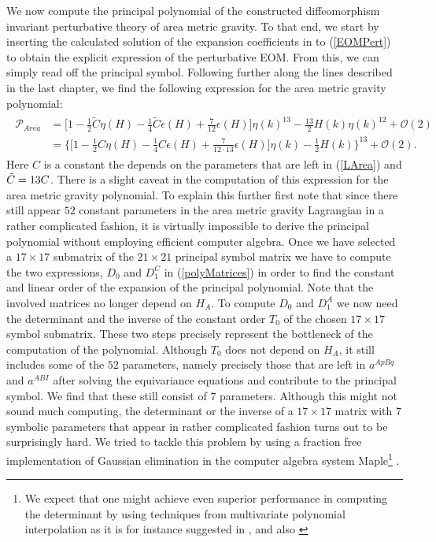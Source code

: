 We now compute the principal polynomial of the constructed diffeomorphism invariant perturbative theory of area metric gravity. To that end, we start by inserting the calculated solution of the expansion coefficients in to (\ref{EOMPert}) to obtain the explicit expression of the perturbative EOM. From this, we can simply read off the principal symbol. Following further along the lines described in the last chapter, we find the following expression for the area metric gravity polynomial:
\begin{align} \label{AreaPoly}
\begin{aligned}
    \mathcal{P}_{Area} &= \bigl[1 - \frac{1}{2} \tilde{C}\eta(H) - \frac{1}{4} \tilde{C} \epsilon(H) + \frac{7}{12} \epsilon(H) \bigr] \eta(k)^{13} - \frac{13}{2}H(k) \eta(k)^{12} + \mathcal{O}(2) \\
    &=\bigl\{  \bigl[ 1 - \frac{1}{2} C \eta(H) - \frac{1}{4} C \epsilon(H) +  \frac{7}{12\cdot13} \epsilon(H) \bigr] \eta(k) - \frac{1}{2} H(k)       \bigr\}^{13} + \mathcal{O}(2).
\end{aligned}
\end{align}
Here $C$ is a constant the depends on the parameters that are left in (\ref{LArea}) and $\Tilde{C} = 13 C$.
There is a slight caveat in the computation of this expression for the area metric gravity polynomial. 
To explain this further first note that since there still appear $52$ constant parameters in the area metric gravity Lagrangian in a rather complicated fashion, it is virtually impossible to derive the principal polynomial without employing efficient computer algebra. Once we have selected a $17 \times 17$ submatrix of the $21 \times 21$ principal symbol matrix we have to compute the two expressions, $D_0$ and $D_{1}^C$ in (\ref{polyMatrices}) in order to find the constant and linear order of the expansion of the principal polynomial. Note that the involved matrices no longer depend on $H_A$. To compute $D_0$ and $D_1^A$ we now need the determinant and the inverse of the constant order $T_0$ of the chosen $17 \times 17$ symbol submatrix. These two steps precisely represent the bottleneck of the computation of the polynomial. Although $T_0$ does not depend on $H_A$, it still includes some of the $52$ parameters, namely precisely those that are left in $a^{ApBq}$ and $a^{ABI}$ after solving the equivariance equations and contribute to the principal symbol. We find that these still consist of $7$ parameters. Although this might not sound much computing, the determinant or the inverse of a $17 \times 17$ matrix with $7$ symbolic parameters that appear in rather complicated fashion turns out to be surprisingly hard. We tried to tackle this problem by using a fraction free implementation of Gaussian elimination in the computer algebra system Maple\footnote{We expect that one might achieve even superior performance in computing the determinant by using techniques from multivariate polynomial interpolation as it is for instance suggested in \cite{Qin2018}, \cite{MARCO2004749} and also \cite{articleDet}} \cite{Maple}.

